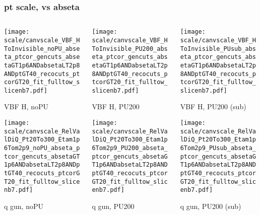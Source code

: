\documentclass[8pt]{beamer}
\begin{document}
  \begin{frame}
  \frametitle{pt scale, vs abseta}
  
  \begin{columns}
   \begin{column}{0.35\textwidth}
     \texttt{[image: scale/canvscale\_VBF\_HToInvisible\_noPU\_abseta\_ptcor\_gencuts\_absetaGT1p6ANDabsetaLT2p8ANDptGT40\_recocuts\_ptcorGT20\_fit\_fulltow\_slicenb7.pdf]}
     
     VBF H, noPU
    
     \texttt{[image: scale/canvscale\_RelValDiQ\_Pt20To300\_Etam1p6Tom2p9\_noPU\_abseta\_ptcor\_gencuts\_absetaGT1p6ANDabsetaLT2p8ANDptGT40\_recocuts\_ptcorGT20\_fit\_fulltow\_slicenb7.pdf]}
     
     q gun, noPU
   \end{column}
   \begin{column}{0.35\textwidth}
     \texttt{[image: scale/canvscale\_VBF\_HToInvisible\_PU200\_abseta\_ptcor\_gencuts\_absetaGT1p6ANDabsetaLT2p8ANDptGT40\_recocuts\_ptcorGT20\_fit\_fulltow\_slicenb7.pdf]}
     
     VBF H, PU200
    
     \texttt{[image: scale/canvscale\_RelValDiQ\_Pt20To300\_Etam1p6Tom2p9\_PU200\_abseta\_ptcor\_gencuts\_absetaGT1p6ANDabsetaLT2p8ANDptGT40\_recocuts\_ptcorGT20\_fit\_fulltow\_slicenb7.pdf]}
     
     q gun, PU200
   \end{column}
   \begin{column}{0.35\textwidth}
     \texttt{[image: scale/canvscale\_VBF\_HToInvisible\_PUsub\_abseta\_ptcor\_gencuts\_absetaGT1p6ANDabsetaLT2p8ANDptGT40\_recocuts\_ptcorGT20\_fit\_fulltow\_slicenb7.pdf]}
     
     VBF H, PU200 (sub)
    
     \texttt{[image: scale/canvscale\_RelValDiQ\_Pt20To300\_Etam1p6Tom2p9\_PUsub\_abseta\_ptcor\_gencuts\_absetaGT1p6ANDabsetaLT2p8ANDptGT40\_recocuts\_ptcorGT20\_fit\_fulltow\_slicenb7.pdf]}
     
     q gun, PU200 (sub)
   \end{column}
  \end{columns}
 \end{frame}
 
\end{document}
